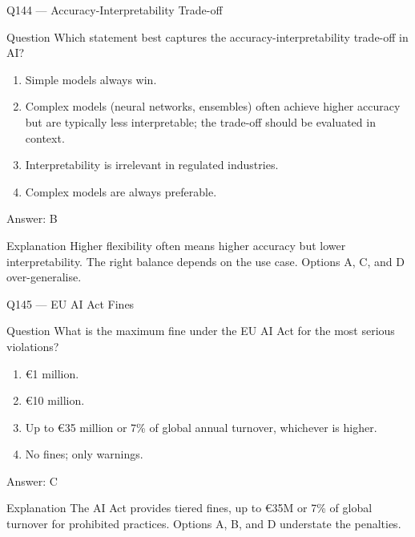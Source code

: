 \documentclass[aspectratio=169,8pt]{beamer}
\begin{document}
\begin{frame}{Q144 --- Accuracy-Interpretability Trade-off}
\begin{block}{Question}
Which statement best captures the accuracy-interpretability trade-off in AI?
\begin{enumerate}
\item Simple models always win.
\item Complex models (neural networks, ensembles) often achieve higher accuracy but are typically less interpretable; the trade-off should be evaluated in context.
\item Interpretability is irrelevant in regulated industries.
\item Complex models are always preferable.
\end{enumerate} 	\end{block}
\begin{exampleblock}{Answer: B}\end{exampleblock}
\begin{block}{Explanation}
Higher flexibility often means higher accuracy but lower interpretability. The right balance depends on the use case. Options A, C, and D over-generalise.
\end{block}
\end{frame}

\begin{frame}{Q145 --- EU AI Act Fines}
\begin{block}{Question}
What is the maximum fine under the EU AI Act for the most serious violations?
\begin{enumerate}
\item €1 million.
\item €10 million.
\item Up to €35 million or 7\% of global annual turnover, whichever is higher.
\item No fines; only warnings.
\end{enumerate} 	\end{block}
\begin{exampleblock}{Answer: C}\end{exampleblock}
\begin{block}{Explanation}
The AI Act provides tiered fines, up to €35M or 7\% of global turnover for prohibited practices. Options A, B, and D understate the penalties.
\end{block}
\end{frame}
\end{document}
